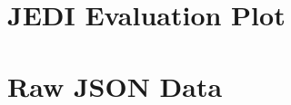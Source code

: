 \documentclass[twoside=false,11pt,paper=a4]{jureap}
\begin{document}
\pagestyle{main}
\maketitle
\section{JEDI Evaluation Plot}





\clearpage

\section{Raw JSON Data}


\end{document}
